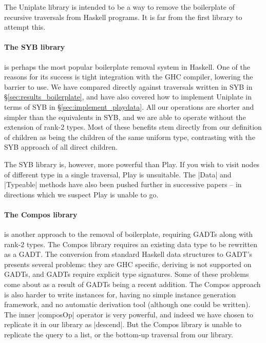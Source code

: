 \documentclass[preprint]{sigplanconf}
\begin{document}
The Uniplate library is intended to be a way to remove the boilerplate of recursive traversals from Haskell programs. It is far from the first library to attempt this.

\paragraph{The SYB library} \citep{lammel:syb} is perhaps the most popular boilerplate removal system in Haskell. One of the reasons for its success is tight integration with the GHC compiler, lowering the barrier to use. We have compared directly against traversals written in SYB in \S\ref{sec:results_boilerplate}, and have also covered how to implement Uniplate in terms of SYB in \S\ref{sec:implement_playdata}. All our operations are shorter and simpler than the equivalents in SYB, and we are able to operate without the extension of rank-2 types. Most of these benefits stem directly from our definition of children as being the children of the same uniform type, contrasting with the SYB approach of all direct children.

The SYB library is, however, more powerful than Play. If you wish to visit nodes of different type in a single traversal, Play is unsuitable. The |Data| and |Typeable| methods have also been pushed further in successive papers \citep{lammel:syb2,lammel:syb3} -- in directions which we suspect Play is unable to go.

\paragraph{The Compos library} \citep{bringert:compos} is another approach to the removal of boilerplate, requiring GADTs \citep{spj:gadt} along with rank-2 types. The Compos library requires an existing data type to be rewritten as a GADT. The conversion from standard Haskell data structures to GADT's presents several problems: they are GHC specific, deriving is not supported on GADTs, and GADTs require explicit type signatures. Some of these problems come about as a result of GADTs being a recent addition. The Compos approach is also harder to write instances for, having no simple instance generation framework, and no automatic derivation tool (although one could be written). The inner |composOp| operator is very powerful, and indeed we have chosen to replicate it in our library as |descend|. But the Compos library is unable to replicate the query to a list, or the bottom-up traversal from our library.
\end{document}
